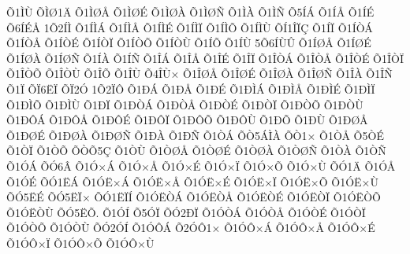{^^d51^^cc^^d9
^^d5^^cc^^d81^^c4
^^d51^^cc^^d8^^c5
^^d51^^cc^^d8^^c9
^^d51^^cc^^d8^^c0
^^d51^^cc^^d8^^d1
^^d51^^cc^^c0
^^d51^^cc^^d1
^^d55^^cd^^c1
^^d51^^cd^^c5
^^d51^^cd^^c9
^^d56^^cd^^c9^^c5
1^^d52^^cd^^cc
^^d51^^cd^^cc^^c1
^^d51^^cd^^cc^^c5
^^d51^^cd^^cc^^c9
^^d51^^cd^^cc^^cf
^^d51^^cd^^cc^^d5
^^d51^^cd^^cc^^d9
^^d5^^cd1^^ce^^cf^^c7
^^d51^^cd^^cf
^^d51^^cd^^d2^^c1
^^d51^^cd^^d2^^c5
^^d51^^cd^^d2^^c9
^^d51^^cd^^d2^^cf
^^d51^^cd^^d2^^d5
^^d51^^cd^^d2^^d9
^^d51^^cd^^d5
^^d51^^cd^^d9
5^^d56^^cd^^d9^^db
^^d51^^cd^^d8^^c5
^^d51^^cd^^d8^^c9
^^d51^^cd^^d8^^c0
^^d51^^cd^^d8^^d1
^^d51^^cd^^c0
^^d51^^cd^^d1
^^d51^^ce^^c1
^^d51^^ce^^c5
^^d51^^ce^^c9
^^d51^^ce^^cf
^^d51^^ce^^d2^^c1
^^d51^^ce^^d2^^c5
^^d51^^ce^^d2^^c9
^^d51^^ce^^d2^^cf
^^d51^^ce^^d2^^d5
^^d51^^ce^^d2^^d9
^^d51^^ce^^d5
^^d51^^ce^^d9
^^d54^^ce^^d9^^d7
^^d51^^ce^^d8^^c5
^^d51^^ce^^d8^^c9
^^d51^^ce^^d8^^c0
^^d51^^ce^^d8^^d1
^^d51^^ce^^c0
^^d51^^ce^^d1
^^d51^^cf
^^d5^^cf6^^cb^^cf
^^d5^^cf2^^d3
1^^d52^^cf^^d4
^^d51^^d0^^c1
^^d51^^d0^^c5
^^d51^^d0^^c9
^^d51^^d0^^cc^^c1
^^d51^^d0^^cc^^c5
^^d51^^d0^^cc^^c9
^^d51^^d0^^cc^^cf
^^d51^^d0^^cc^^d5
^^d51^^d0^^cc^^d9
^^d51^^d0^^cf
^^d51^^d0^^d2^^c1
^^d51^^d0^^d2^^c5
^^d51^^d0^^d2^^c9
^^d51^^d0^^d2^^cf
^^d51^^d0^^d2^^d5
^^d51^^d0^^d2^^d9
^^d51^^d0^^d4^^c1
^^d51^^d0^^d4^^c5
^^d51^^d0^^d4^^c9
^^d51^^d0^^d4^^cf
^^d51^^d0^^d4^^d5
^^d51^^d0^^d4^^d9
^^d51^^d0^^d5
^^d51^^d0^^d9
^^d51^^d0^^d8^^c5
^^d51^^d0^^d8^^c9
^^d51^^d0^^d8^^c0
^^d51^^d0^^d8^^d1
^^d51^^d0^^c0
^^d51^^d0^^d1
^^d51^^d2^^c1
^^d5^^d25^^c1^^cc^^c0
^^d5^^d21^^d7
^^d51^^d2^^c5
^^d55^^d2^^c9
^^d51^^d2^^cf
^^d51^^d2^^d5
^^d5^^d2^^d55^^c7
^^d51^^d2^^d9
^^d51^^d2^^d8^^c5
^^d51^^d2^^d8^^c9
^^d51^^d2^^d8^^c0
^^d51^^d2^^d8^^d1
^^d51^^d2^^c0
^^d51^^d2^^d1
^^d51^^d3^^c1
^^d5^^d36^^c2
^^d51^^d3^^d7^^c1
^^d51^^d3^^d7^^c5
^^d51^^d3^^d7^^c9
^^d51^^d3^^d7^^cf
^^d51^^d3^^d7^^d5
^^d51^^d3^^d7^^d9
^^d5^^d31^^c4
^^d51^^d3^^c5
^^d51^^d3^^c9
^^d5^^d31^^cb^^c1
^^d51^^d3^^cb^^d7^^c1
^^d51^^d3^^cb^^d7^^c5
^^d51^^d3^^cb^^d7^^c9
^^d51^^d3^^cb^^d7^^cf
^^d51^^d3^^cb^^d7^^d5
^^d51^^d3^^cb^^d7^^d9
^^d5^^d35^^cb^^c9
^^d5^^d35^^cb^^cf^^d7
^^d5^^d31^^cb^^cf^^cd
^^d51^^d3^^cb^^d2^^c1
^^d51^^d3^^cb^^d2^^c5
^^d51^^d3^^cb^^d2^^c9
^^d51^^d3^^cb^^d2^^cf
^^d51^^d3^^cb^^d2^^d5
^^d51^^d3^^cb^^d2^^d9
^^d5^^d35^^cb^^d5.
^^d51^^d3^^cd
^^d55^^d3^^cf
^^d5^^d32^^d0^^cf
^^d51^^d3^^d2^^c1
^^d51^^d3^^d2^^c5
^^d51^^d3^^d2^^c9
^^d51^^d3^^d2^^cf
^^d51^^d3^^d2^^d5
^^d51^^d3^^d2^^d9
^^d5^^d32^^d3^^cd
^^d51^^d3^^d4^^c1
^^d52^^d3^^d41^^d7
^^d51^^d3^^d4^^d7^^c1
^^d51^^d3^^d4^^d7^^c5
^^d51^^d3^^d4^^d7^^c9
^^d51^^d3^^d4^^d7^^cf
^^d51^^d3^^d4^^d7^^d5
^^d51^^d3^^d4^^d7^^d9
}
